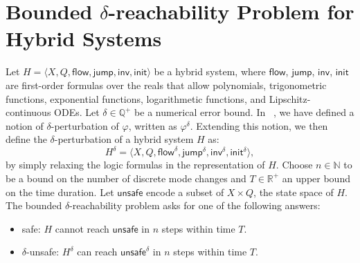 \section{Bounded $\delta$-reachability Problem for Hybrid Systems}
Let $H = \langle X, Q, \mathsf{flow}, \mathsf{jump},
\mathsf{inv},\mathsf{init}\rangle$ be a hybrid system, where
$\mathsf{flow}$, $\mathsf{jump}$, $\mathsf{inv}$, $\mathsf{init}$ are
first-order formulas over the reals that allow polynomials,
trigonometric functions, exponential functions, logarithmetic
functions, and Lipschitz-continuous ODEs. Let $\delta \in
\mathbb{Q}^{+}$ be a numerical error bound. In
~\cite{DBLP:journals/corr/GaoKCC14}, we have defined a notion of
$\delta$-perturbation of $\varphi$, written as
$\varphi^{\delta}$. Extending this notion, we then define the
$\delta$-perturbation of a hybrid system $H$ as:
\[
H^{\delta} = \langle X, Q, {\mathsf{flow}}^{\delta},
{\mathsf{jump}}^{\delta}, {\mathsf{inv}}^{\delta},
{\mathsf{init}}^{\delta}\rangle,
\]
by simply relaxing the logic formulas in the representation of $H$.
Choose $n\in\mathbb{N}$ to be a bound on the number of discrete mode
changes and $T\in \mathbb{R}^+$ an upper bound on the time duration.
Let $\mathsf{unsafe}$ encode a subset of $X\times Q$, the state space
of $H$. The bounded $\delta$-reachability problem asks for one of the
following answers:

\begin{itemize}
\item  safe: $H$ cannot reach $\mathsf{unsafe}$ in $n$ steps within
  time $T$.
\item $\delta$-unsafe: $H^{\delta}$ can reach ${\mathsf{unsafe}}^{\delta}$ in $n$ steps within time $T$.
\end{itemize}


